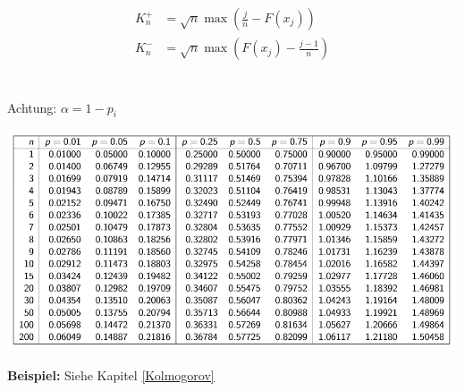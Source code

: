 \begin{align*}
	K_n^+ &= \sqrt{n}\max\left(\frac{j}{n} - F(x_j)\right) \\
	K_n^- &= \sqrt{n}\max\left(F(x_j) - \frac{j-1}{n}\right) \\
\end{align*}

~\\
Achtung: $\alpha = 1 - p_i$
\begin{center}
	\includegraphics[width=\columnwidth]{Images/ktabelle}
\end{center}

\noindent\textbf{Beispiel:} Siehe Kapitel \ref{Kolmogorov}
